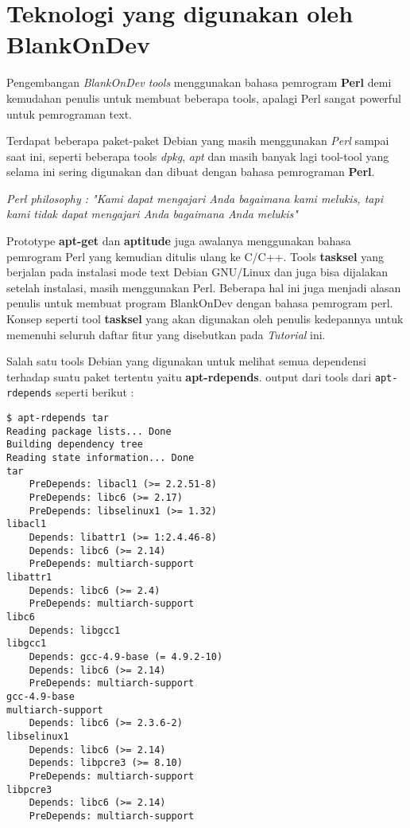 \section{Teknologi yang digunakan oleh BlankOnDev}\label{sec:tekno}
\noindent
Pengembangan \textit{BlankOnDev tools} menggunakan bahasa pemrogram \textbf{Perl} demi kemudahan penulis untuk membuat beberapa tools, apalagi Perl sangat powerful untuk pemrograman text. 

\noindent
Terdapat beberapa paket-paket Debian yang masih menggunakan \textit{Perl} sampai saat ini, seperti beberapa tools \textit{dpkg}, \textit{apt} dan masih banyak lagi tool-tool yang selama ini sering digunakan dan dibuat dengan bahasa pemrograman \textbf{Perl}. 

\noindent
\textit{Perl philosophy : "Kami dapat mengajari Anda bagaimana kami melukis, tapi kami tidak dapat mengajari Anda bagaimana Anda melukis"}

\noindent
Prototype \textbf{apt-get} dan \textbf{aptitude} juga awalanya menggunakan bahasa pemrogram Perl yang kemudian ditulis ulang ke C/C++. Tools \textbf{tasksel} yang berjalan pada instalasi mode text Debian GNU/Linux dan juga bisa dijalakan setelah instalasi, masih menggunakan Perl. Beberapa hal ini juga menjadi alasan penulis untuk membuat program BlankOnDev dengan bahasa pemrogram perl. Konsep seperti tool \textbf{tasksel} yang akan digunakan oleh penulis kedepannya untuk memenuhi seluruh daftar fitur yang disebutkan pada \textit{Tutorial} ini.

\noindent
Salah satu tools Debian yang digunakan untuk melihat semua dependensi terhadap suatu paket tertentu yaitu \textbf{apt-rdepends}. output dari tools dari \texttt{apt-rdepends} seperti berikut :\label{text:apt-rdepends}
\pagebreak
\begin{lstlisting}[language=ShellBash]
$ apt-rdepends tar
Reading package lists... Done
Building dependency tree       
Reading state information... Done
tar
	PreDepends: libacl1 (>= 2.2.51-8)
	PreDepends: libc6 (>= 2.17)
	PreDepends: libselinux1 (>= 1.32)
libacl1
	Depends: libattr1 (>= 1:2.4.46-8)
	Depends: libc6 (>= 2.14)
	PreDepends: multiarch-support
libattr1
	Depends: libc6 (>= 2.4)
	PreDepends: multiarch-support
libc6
	Depends: libgcc1
libgcc1
	Depends: gcc-4.9-base (= 4.9.2-10)
	Depends: libc6 (>= 2.14)
	PreDepends: multiarch-support
gcc-4.9-base
multiarch-support
	Depends: libc6 (>= 2.3.6-2)
libselinux1
	Depends: libc6 (>= 2.14)
	Depends: libpcre3 (>= 8.10)
	PreDepends: multiarch-support
libpcre3
	Depends: libc6 (>= 2.14)
	PreDepends: multiarch-support
\end{lstlisting}

